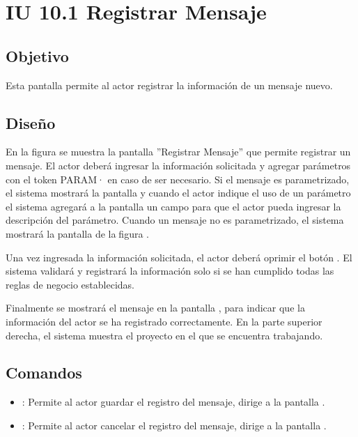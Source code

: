\section{IU 10.1 Registrar Mensaje}

\subsection{Objetivo}
	Esta pantalla permite al actor registrar la información de un mensaje nuevo.
\subsection{Diseño}
	En la figura  se muestra la pantalla ''Registrar Mensaje'' que permite registrar un mensaje.
	El actor deberá ingresar la información solicitada y agregar parámetros con el token PARAM· en caso de ser necesario. Si el mensaje es parametrizado, el sistema mostrará la pantalla  y cuando el actor indique el uso de un parámetro el sistema agregará a la pantalla un campo para que el actor pueda ingresar la descripción del parámetro. Cuando un mensaje no es parametrizado, el sistema mostrará la pantalla de lafigura .
	
	Una vez ingresada la información solicitada, el actor deberá oprimir el botón  . El sistema validará y registrará la información solo si se han cumplido todas las reglas de negocio establecidas.
	
	Finalmente se mostrará el mensaje  en la pantalla , para indicar que la información del actor se ha registrado correctamente.
	En la parte superior derecha, el sistema muestra el proyecto en el que se encuentra trabajando.

\subsection{Comandos}
\begin{itemize}
	\item {}: Permite al actor guardar el registro del mensaje, dirige a la pantalla .
	\item {}: Permite al actor cancelar el registro del mensaje, dirige a la pantalla .
\end{itemize}

